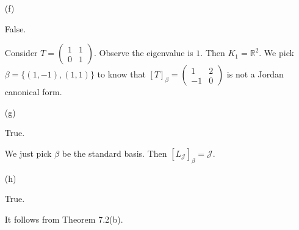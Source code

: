 \begin{Exercise}
\begin{enumerate}[(a)]
		\item[(f)]
		\begin{answer}
			False.
		\end{answer}
		\begin{solution}
			Consider $T = \begin{pmatrix}
			1 & 1 \\
			0 & 1
			\end{pmatrix}$. Observe the eigenvalue is $1$. Then $K_1 = \mathbb{R}^2$. We pick $\beta = \{(1,-1),(1,1)\}$ to know that $[T]_{\beta} = \begin{pmatrix}
			1 & 2 \\
			-1 & 0
			\end{pmatrix}$ is not a Jordan canonical form.
		\end{solution}
		
		\item[(g)]
		\begin{answer}
			True.
		\end{answer}
		\begin{solution}
			We just pick $\beta$ be the standard basis. Then $[L_\mathcal{J}]_{\beta} = \mathcal{J}$.
		\end{solution}
		
		\item[(h)]
		\begin{answer}
			True.
		\end{answer}
		\begin{solution}
			It follows from Theorem 7.2(b).
		\end{solution}
		
	\end{enumerate}
\end{Exercise}